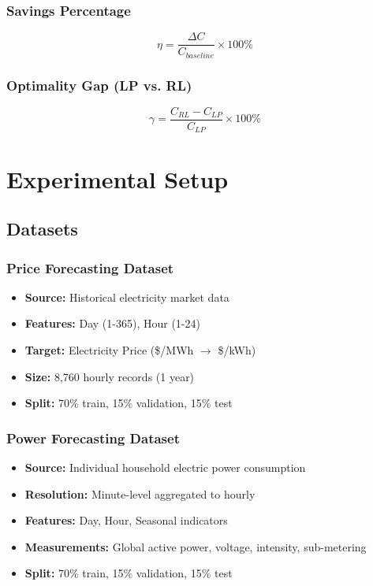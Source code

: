 \documentclass[conference]{IEEEtran}
\begin{document}
\subsubsection{Savings Percentage}
\begin{equation}
\eta = \frac{\Delta C}{C_{baseline}} \times 100\%
\end{equation}

\subsubsection{Optimality Gap (LP vs. RL)}
\begin{equation}
\gamma = \frac{C_{RL} - C_{LP}}{C_{LP}} \times 100\%
\end{equation}

\section{Experimental Setup}

\subsection{Datasets}

\subsubsection{Price Forecasting Dataset}
\begin{itemize}
    \item \textbf{Source:} Historical electricity market data
    \item \textbf{Features:} Day (1-365), Hour (1-24)
    \item \textbf{Target:} Electricity Price (\$/MWh $\rightarrow$ \$/kWh)
    \item \textbf{Size:} 8,760 hourly records (1 year)
    \item \textbf{Split:} 70\% train, 15\% validation, 15\% test
\end{itemize}

\subsubsection{Power Forecasting Dataset}
\begin{itemize}
    \item \textbf{Source:} Individual household electric power consumption
    \item \textbf{Resolution:} Minute-level aggregated to hourly
    \item \textbf{Features:} Day, Hour, Seasonal indicators
    \item \textbf{Measurements:} Global active power, voltage, intensity, sub-metering
    \item \textbf{Split:} 70\% train, 15\% validation, 15\% test
\end{itemize}
\end{document}
